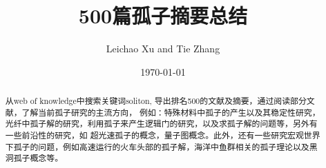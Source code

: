 \documentclass{article}
\begin{document}
\title{500篇孤子摘要总结}

\author{Leichao Xu and Tie Zhang}

\date{\today}



\maketitle
\begin{abstract}
从web of knowledge中搜索关键词soliton, 导出排名500的文献及摘要，通过阅读部分文献，了解当前孤子研究的主流方向，
例如：特殊材料中孤子的产生以及其稳定性研究，光纤中孤子解的研究，利用孤子来产生逻辑门的研究，以及求孤子解的问题等，另外有一些前沿性的研究，如
超光速孤子的概念，量子图概念。此外，还有一些研究宏观世界下孤子的问题，例如高速运行的火车头部的孤子解，海洋中鱼群相关的孤子理论以及黑洞孤子概念等。
\end{abstract}
\end{document}
